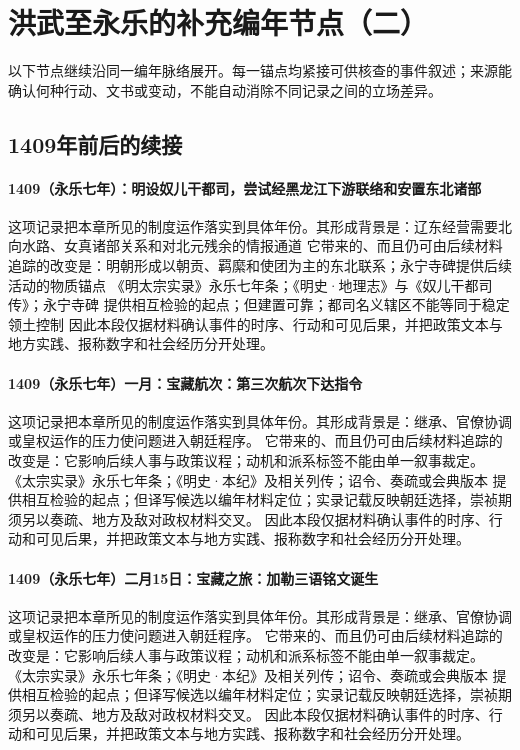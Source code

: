 \section{洪武至永乐的补充编年节点（二）}
以下节点继续沿同一编年脉络展开。每一锚点均紧接可供核查的事件叙述；来源能确认何种行动、文书或变动，不能自动消除不同记录之间的立场差异。

\subsection{1409年前后的续接}

\paragraph{1409（永乐七年）：明设奴儿干都司，尝试经黑龙江下游联络和安置东北诸部} 这项记录把本章所见的制度运作落实到具体年份。其形成背景是：辽东经营需要北向水路、女真诸部关系和对北元残余的情报通道 它带来的、而且仍可由后续材料追踪的改变是：明朝形成以朝贡、羁縻和使团为主的东北联系；永宁寺碑提供后续活动的物质锚点 《明太宗实录》永乐七年条；《明史·地理志》与《奴儿干都司传》；永宁寺碑 提供相互检验的起点；但建置可靠；都司名义辖区不能等同于稳定领土控制 因此本段仅据材料确认事件的时序、行动和可见后果，并把政策文本与地方实践、报称数字和社会经历分开处理。

\paragraph{1409（永乐七年）一月：宝藏航次：第三次航次下达指令} 这项记录把本章所见的制度运作落实到具体年份。其形成背景是：继承、官僚协调或皇权运作的压力使问题进入朝廷程序。 它带来的、而且仍可由后续材料追踪的改变是：它影响后续人事与政策议程；动机和派系标签不能由单一叙事裁定。 《太宗实录》永乐七年条；《明史·本纪》及相关列传；诏令、奏疏或会典版本 提供相互检验的起点；但译写候选以编年材料定位；实录记载反映朝廷选择，崇祯期须另以奏疏、地方及敌对政权材料交叉。 因此本段仅据材料确认事件的时序、行动和可见后果，并把政策文本与地方实践、报称数字和社会经历分开处理。

\paragraph{1409（永乐七年）二月15日：宝藏之旅：加勒三语铭文诞生} 这项记录把本章所见的制度运作落实到具体年份。其形成背景是：继承、官僚协调或皇权运作的压力使问题进入朝廷程序。 它带来的、而且仍可由后续材料追踪的改变是：它影响后续人事与政策议程；动机和派系标签不能由单一叙事裁定。 《太宗实录》永乐七年条；《明史·本纪》及相关列传；诏令、奏疏或会典版本 提供相互检验的起点；但译写候选以编年材料定位；实录记载反映朝廷选择，崇祯期须另以奏疏、地方及敌对政权材料交叉。 因此本段仅据材料确认事件的时序、行动和可见后果，并把政策文本与地方实践、报称数字和社会经历分开处理。

